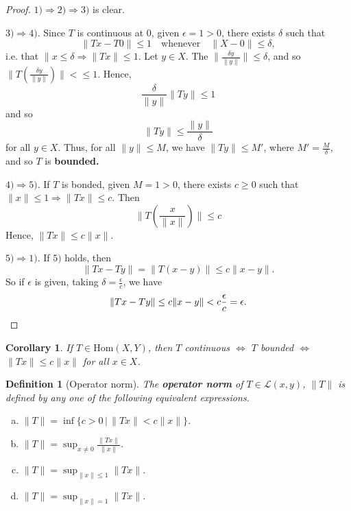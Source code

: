 \documentclass[12pt, oneside, a4paper]{article}
\newtheorem{cor}[thm]{Corollary}
\theoremstyle{dfn}
\newtheorem{dfn}[thm]{Definition}
\begin{document}
\begin{proof}
    $1) \Rightarrow 2) \Rightarrow 3)$ is clear.
    
    $3) \Rightarrow 4)$.  Since $T$ is continuous at 0, given $\epsilon = 1 > 0$, there exists $\delta$ such that \[
        \| Tx - T0 \| \leq 1 \quad \text{whenever} \quad \| X - 0 \| \leq \delta,
    \] i.e. that $\| x \leq \delta \Rightarrow \| Tx \| \leq 1$.  Let $y \in X$.  The $\| \frac{\delta y}{\| y \|} \| \leq \delta$, and so $\| T\left( \frac{\delta y}{\| y \|} \right) \| < \leq 1$.  Hence, \[
        \frac{\delta}{\|y \|} \|T y \| \leq 1
    \] and so \[
        \|Ty \| \leq \frac{ \| y \|}{\delta}
    \] for all $y \in X$.  Thus, for all $\| y \| \leq M$, we have $\| Ty \| \leq M'$, where $M' = \frac{M}{\delta}$, and so $T$ is \textbf{bounded.} 
    
    $4) \Rightarrow 5)$.  If $T$ is bonded, given $M = 1 > 0$, there exists $c \geq 0$ such that $\| x \| \leq 1 \Rightarrow \|T x \| \leq c$.  Then \[
         \|T \left( \frac{x}{\|x \|} \right) \| \leq c  \] 
        Hence, $\|Tx \| \leq c \| x \|$.  
        
    $5) \Rightarrow 1)$.  If $5)$ holds, then  \[
        \| Tx - Ty \| = \| T(x-y) \| \leq c \| x - y \|.
    \]  So if $\epsilon$ is given, taking $\delta = \frac{\epsilon}{c}$, we have \[
        \|Tx - Ty \| \leq c \| x - y \| < c \frac{\epsilon}{c} = \epsilon. \qedhere
    \]
\end{proof}

\begin{cor}
    If $T \in \text{Hom}(X,Y)$, then $T$ continuous $\iff$ $T$ bounded $\iff$ $\|Tx \| \leq c \| x \|$ for all $x \in X$.
\end{cor}

\begin{dfn}[Operator norm]
    The \textbf{operator norm} of $T \in \mathcal{L}(x,y)$, $\| T\|$ is defined by any one of the following equivalent expressions.
    \begin{enumerate}[(a)]
        \item $\|T \| = \inf \{ c > 0 \, | \, \| Tx \| < c \| x \| \}$.
        \item $\| T\| = \sup_{x \neq 0} \frac{ \|Tx \|}{\| x \|}$.
        \item $\| T \| = \sup_{ \|x \| \leq 1} \| Tx \|$.
        \item $\| T \| = \sup_{\| x \| = 1} \|T x \|$.
    \end{enumerate}
\end{dfn}
\end{document}
